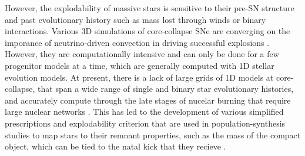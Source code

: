 \documentclass[linenumbers,trackchanges,twocolumn]{aastex701}
\begin{document}
However, the explodability of massive stars is sensitive to their pre-SN structure and past evolutionary history such as mass
lost through winds or binary interactions. Various 3D simulations of core-collapse SNe are
converging on the imporance of neutrino-driven convection in
 driving successful explosions \citep[e.g.,][]{2021Natur.589...29B, 2025arXiv250214836J}. However, they are
computationally intensive and can only be done for a few progenitor models at a time, which are generally computed with 1D stellar evolution models. At present, there is a lack of large grids of 1D models at core-collapse, that span a wide range of single and binary star evolutionary histories, and accurately compute through the late stages of nucelar burning that require large nuclear networks \citep[e.g.,][]{2016ApJS..227...22F, renzo2024progenitorsmallreactionnetworks,2025ApJS..279...49G}. This has led to the development of various simplified prescriptions and explodability criterion \citep[e.g.,][]{Fryer_2012,Patton_2020,2025A&A...700A..20M} that are used in population-synthesis studies to map stars to their remnant properties, such as the mass of the compact object, which can be tied to the natal kick that they recieve \citep[e.g.,][]{2020MNRAS.499.3214M}.
\end{document}

